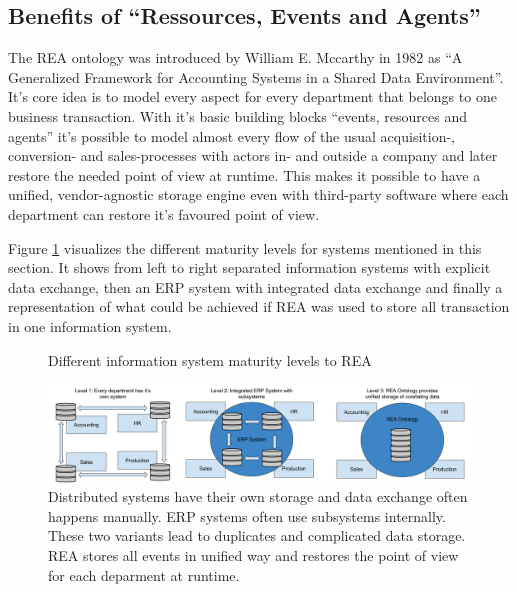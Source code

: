 \subsection*{Benefits of ``Ressources, Events and Agents''}
The REA ontology was introduced by William E. Mccarthy in 1982 as ``A Generalized Framework for Accounting Systems in a Shared Data Environment''. \cite{mccarthy1982rea}
It's core idea is to model every aspect for every department that belongs to one business transaction.
With it's basic building blocks ``events, resources and agents'' it's possible to model almost every flow of the usual acquisition-, conversion- and sales-processes with actors in- and outside a company and later restore the needed point of view at runtime.
This makes it possible to have a unified, vendor-agnostic storage engine even with third-party software where each department can restore it's favoured point of view.

Figure \ref{fig:REA-maturity-levels} visualizes the different maturity levels for systems mentioned in this section. It shows from left to right separated information systems with explicit data exchange, then an ERP system with integrated data exchange and finally a representation of what could be achieved if REA was used to store all transaction in one information system.
\begin{figure}
\centering
\caption{Different information system maturity levels to REA}
\label{fig:REA-maturity-levels}
\includegraphics[width=1.0\linewidth]{"../figures/Drawing 00 - Different IS maturity levels to REA"}
\caption*{Distributed systems have their own storage and data exchange often happens manually. ERP systems often use subsystems internally. These two variants lead to duplicates and complicated data storage. REA stores all events in unified way and restores the point of view for each deparment at runtime.}
\end{figure}

